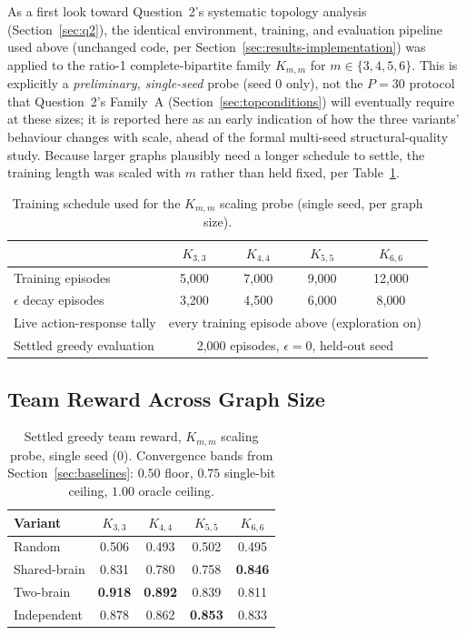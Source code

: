 \documentclass[a4paper,twoside,12pt]{report}
\begin{document}
As a first look toward Question~2's systematic topology analysis
(Section~\ref{sec:q2}), the identical environment, training, and evaluation
pipeline used above (unchanged code, per Section~\ref{sec:results-implementation})
was applied to the ratio-1 complete-bipartite family $K_{m,m}$ for
$m \in \{3,4,5,6\}$. This is explicitly a \emph{preliminary, single-seed}
probe (seed 0 only), not the $P=30$ protocol that Question~2's Family~A
(Section~\ref{sec:topconditions}) will eventually require at these sizes; it
is reported here as an early indication of how the three variants' behaviour
changes with scale, ahead of the formal multi-seed structural-quality study.
Because larger graphs plausibly need a longer schedule to settle, the
training length was scaled with $m$ rather than held fixed, per
Table~\ref{tab:q1-scaling-schedule}.

\begin{table}[H]
\centering
\caption{Training schedule used for the $K_{m,m}$ scaling probe (single seed,
per graph size).}
\label{tab:q1-scaling-schedule}
\begin{tabular}{lcccc}
\toprule
& $K_{3,3}$ & $K_{4,4}$ & $K_{5,5}$ & $K_{6,6}$ \\
\midrule
Training episodes            & 5{,}000 & 7{,}000 & 9{,}000 & 12{,}000 \\
$\epsilon$ decay episodes    & 3{,}200 & 4{,}500 & 6{,}000 & 8{,}000 \\
Live action-response tally   & \multicolumn{4}{c}{every training episode above (exploration on)} \\
Settled greedy evaluation    & \multicolumn{4}{c}{2{,}000 episodes, $\epsilon = 0$, held-out seed} \\
\bottomrule
\end{tabular}
\end{table}

\subsection{Team Reward Across Graph Size}

\begin{table}[H]
\centering
\caption{Settled greedy team reward, $K_{m,m}$ scaling probe, single seed
(0). Convergence bands from Section~\ref{sec:baselines}: $0.50$ floor, $0.75$
single-bit ceiling, $1.00$ oracle ceiling.}
\label{tab:q1-scaling-reward}
\renewcommand{\arraystretch}{1.25}
\begin{tabular}{lcccc}
\toprule
\textbf{Variant} & $K_{3,3}$ & $K_{4,4}$ & $K_{5,5}$ & $K_{6,6}$ \\
\midrule
Random       & 0.506 & 0.493 & 0.502 & 0.495 \\
Shared-brain & 0.831 & 0.780 & 0.758 & \textbf{0.846} \\
Two-brain    & \textbf{0.918} & \textbf{0.892} & 0.839 & 0.811 \\
Independent  & 0.878 & 0.862 & \textbf{0.853} & 0.833 \\
\bottomrule
\end{tabular}
\end{table}
\end{document}
